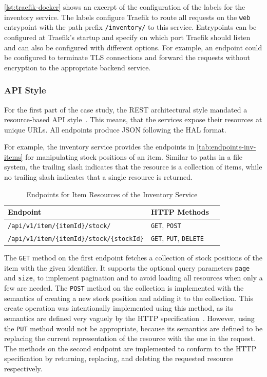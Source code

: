 \autoref{lst:traefik-docker} shows an excerpt of the configuration of the labels for the inventory service.
The labels configure Traefik to route all requests on the \texttt{web} entrypoint with the path prefix \texttt{/inventory/} to this service.
Entrypoints can be configured at Traefik's startup and specify on which port Traefik should listen and can also be configured with different options.
For example, an endpoint could be configured to terminate \ac{TLS} connections and forward the requests without encryption to the appropriate backend service.

\subsubsection{\acs{API} Style}

For the first part of the case study, the \ac{REST} architectural style mandated a resource-based \ac{API} style~\cite{Fielding2000}.
This means, that the services expose their resources at unique \acp{URL}.
All endpoints produce \ac{JSON} following the \ac{HAL} format.

For example, the inventory service provides the endpoints in \autoref{tab:endpoints-inv-items} for manipulating stock positions of an item.
Similar to paths in a file system, the trailing slash indicates that the resource is a collection of items, while no trailing slash indicates that a single resource is returned.


\begin{table}[ht]
    \centering
    \begin{tabular}{@{}lll@{}}
        \toprule
        \textbf{Endpoint}                                   & \textbf{\acs{HTTP} Methods} \\
        \midrule
        \texttt{/api/v1/item/\{itemId\}/stock/}             & \texttt{GET}, \texttt{POST} \\
        \texttt{/api/v1/item/\{itemId\}/stock/\{stockId\}}  & \texttt{GET}, \texttt{PUT}, \texttt{DELETE} \\
        \bottomrule
    \end{tabular}
    \caption{Endpoints for Item Resources of the Inventory Service}\label{tab:endpoints-inv-items}
\end{table}

The \texttt{GET} method on the first endpoint fetches a collection of stock positions of the item with the given identifier.
It supports the optional query parameters \texttt{page} and \texttt{size}, to implement pagination and to avoid loading all resources when only a few are needed.
The \texttt{POST} method on the collection is implemented with the semantics of creating a new stock position and adding it to the collection.
This create operation was intentionally implemented using this method, as its semantics are defined very vaguely by the \ac{HTTP} specification~\cite{RFC7321}.
However, using the \texttt{PUT} method would not be appropriate, because its semantics are defined to be replacing the current representation of the resource with the one in the request.
The methods on the second endpoint are implemented to conform to the \ac{HTTP} specification by returning, replacing, and deleting the requested resource respectively.

